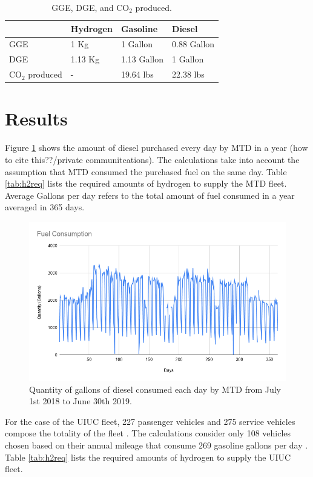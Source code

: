 \documentclass{anstrans}
\begin{document}
\begin{table}[]
	\centering
    \caption{GGE, DGE, and CO$_2$ produced.}
    \label{tab:meth}
	\begin{tabular}{l|lll}
	\hline
	                 & Hydrogen & Gasoline    & Diesel      \\ \hline
	GGE              & 1 Kg     & 1 Gallon    & 0.88 Gallon \\
	DGE              & 1.13 Kg  & 1.13 Gallon & 1 Gallon    \\
    CO$_2$ produced  & -        & 19.64 lbs   & 22.38 lbs   \\ \hline

	\end{tabular}
\end{table}

\section{Results}

Figure \ref{fig:mtdfuel} shows the amount of diesel purchased every day by MTD in a year (how to cite this??/private communitcations). The calculations take into account the assumption that MTD consumed the purchased fuel on the same day.
Table \ref{tab:h2req} lists the required amounts of hydrogen to supply the MTD fleet. Average Gallons per day refers to the total amount of fuel consumed in a year averaged in 365 days.

\begin{figure}[]
	\centering
	\includegraphics[width=0.6\linewidth]{figures/fuelconsumption.png}
	\hfill
	\caption{Quantity of gallons of diesel consumed each day by MTD from July 1st 2018 to June 30th 2019.}
	\label{fig:mtdfuel}
\end{figure}

For the case of the UIUC fleet, 227 passenger vehicles and 275 service vehicles compose the totality of the fleet \cite{noauthor_increase_2020}. The calculations consider only 108 vehicles chosen based on their annual mileage that consume 269 gasoline gallons per day \cite{holcomb_fueling_2015}. Table \ref{tab:h2req} lists the required amounts of hydrogen to supply the UIUC fleet.
\end{document}
